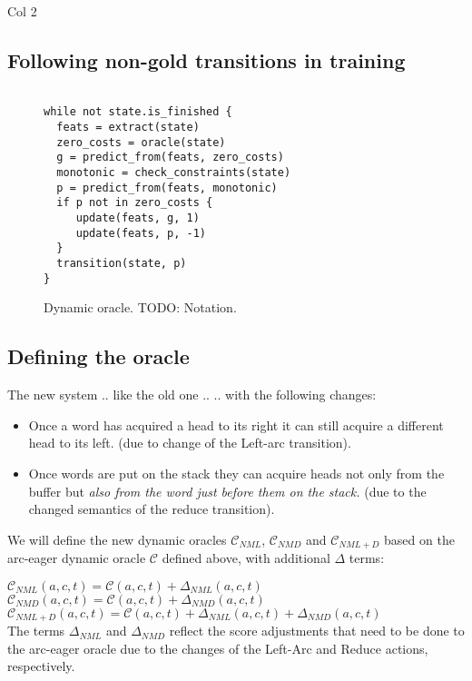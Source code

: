 \documentclass[11pt,letterpaper]{article}
\begin{document}
 Col 2
\subsection{Following non-gold transitions in training}
\begin{figure}
\centering
    \begin{verbatim}

while not state.is_finished {
  feats = extract(state)
  zero_costs = oracle(state)
  g = predict_from(feats, zero_costs)
  monotonic = check_constraints(state)
  p = predict_from(feats, monotonic)
  if p not in zero_costs {
     update(feats, g, 1)
     update(feats, p, -1)
  }
  transition(state, p)
}
\end{verbatim}
\caption{Dynamic oracle. TODO: Notation.}
\end{figure}

\subsection{Defining the oracle}

The new system .. like the old one ..
.. with the following changes:
\begin{itemize}
   \item Once a word has acquired a head to its right it can still acquire a
      different head to its left.  (due to change of the Left-arc transition).
   \item Once words are put on the stack they can acquire heads not only from
      the buffer but \textit{also from the word just before them on the
      stack.} (due to the changed semantics of the reduce transition).
\end{itemize}

We will define the new dynamic oracles $\mathcal{C}_{NML}$,
$\mathcal{C}_{NMD}$ and $\mathcal{C}_{NML+D}$ based on the arc-eager dynamic
oracle $\mathcal{C}$ defined above, with additional $\Delta$ terms:

\noindent$\mathcal{C}_{NML}(a,c,t) = \mathcal{C}(a,c,t) + \Delta_{NML}(a,c,t)$\\

\noindent$\mathcal{C}_{NMD}(a,c,t) = \mathcal{C}(a,c,t) + \Delta_{NMD}(a,c,t)$\\

\noindent$\mathcal{C}_{NML+D}(a,c,t) = \mathcal{C}(a,c,t) + \Delta_{NML}(a,c,t) + \Delta_{NMD}(a,c,t)$\\

The terms $\Delta_{NML}$ and $\Delta_{NMD}$ reflect the score adjustments that
need to be done to the arc-eager oracle due to the changes of the Left-Arc and
Reduce actions, respectively.
\end{document}
